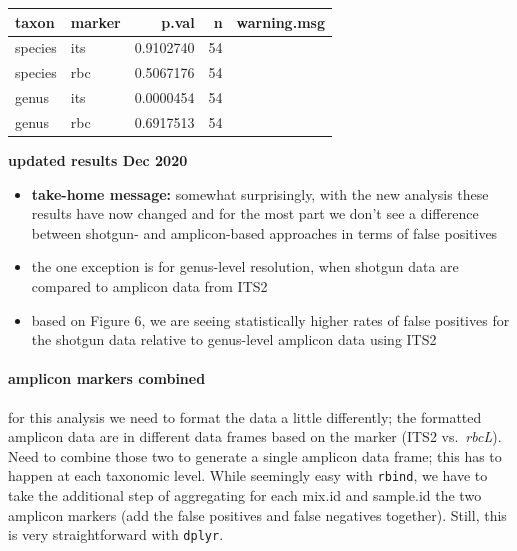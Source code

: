 \documentclass[
]{article}
\providecommand{\tightlist}{%
  \setlength{\itemsep}{0pt}\setlength{\parskip}{0pt}}
\begin{document}
\begin{table}[H]
\centering
\begin{tabular}{l|l|r|r|l}
\hline
taxon & marker & p.val & n & warning.msg\\
\hline
species & its & 0.9102740 & 54 & \\
\hline
species & rbc & 0.5067176 & 54 & \\
\hline
genus & its & 0.0000454 & 54 & \\
\hline
genus & rbc & 0.6917513 & 54 & \\
\hline
\end{tabular}
\end{table}

\textbf{updated results Dec 2020}

\begin{itemize}
\tightlist
\item
  \textbf{take-home message:} somewhat surprisingly, with the new
  analysis these results have now changed and for the most part we don't
  see a difference between shotgun- and amplicon-based approaches in
  terms of false positives
\item
  the one exception is for genus-level resolution, when shotgun data are
  compared to amplicon data from ITS2
\item
  based on Figure 6, we are seeing statistically higher rates of false
  positives for the shotgun data relative to genus-level amplicon data
  using ITS2
\end{itemize}

\hypertarget{amplicon-markers-combined}{%
\paragraph{amplicon markers combined}\label{amplicon-markers-combined}}

for this analysis we need to format the data a little differently; the
formatted amplicon data are in different data frames based on the marker
(ITS2 vs.~\emph{rbcL}). Need to combine those two to generate a single
amplicon data frame; this has to happen at each taxonomic level. While
seemingly easy with \texttt{rbind}, we have to take the additional step
of aggregating for each mix.id and sample.id the two amplicon markers
(add the false positives and false negatives together). Still, this is
very straightforward with \texttt{dplyr}.
\end{document}
